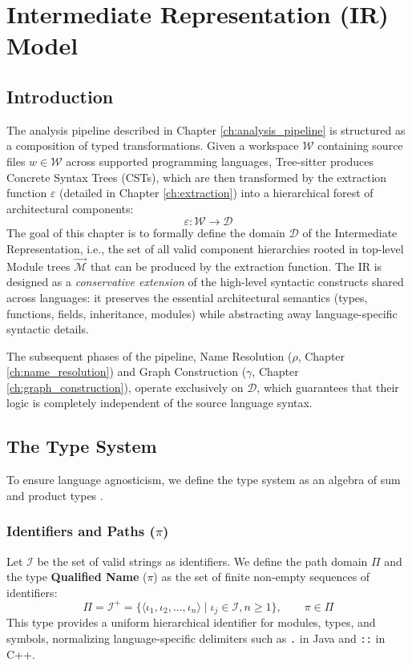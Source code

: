 \chapter{Intermediate Representation (IR) Model}
\label{ch:ir_formalization}

\section{Introduction}
The analysis pipeline described in Chapter \ref{ch:analysis_pipeline}
is structured as a composition of typed transformations. Given a
workspace $\mathcal{W}$ containing source files $w \in \mathcal{W}$
across supported programming languages, Tree-sitter produces Concrete
Syntax Trees (CSTs), which are then transformed by the extraction
function $\varepsilon$ (detailed in Chapter \ref{ch:extraction}) into
a hierarchical forest of architectural components: $$\varepsilon :
\mathcal{W} \to
\mathcal{D}$$ The goal of this chapter is to formally define the
domain $\mathcal{D}$ of the Intermediate Representation, i.e., the
set of all valid component hierarchies rooted in top-level Module
trees $\vec{\mathcal{M}}$ that can be produced by the extraction
function. The IR is designed as a
\textit{conservative extension} \cite{aho_compilers_2007}
of the high-level syntactic constructs shared across languages: it
preserves the essential architectural semantics (types, functions,
fields, inheritance, modules) while abstracting away
language-specific syntactic details.

The subsequent phases of the pipeline, Name Resolution ($\rho$,
Chapter \ref{ch:name_resolution}) and Graph Construction ($\gamma$,
Chapter \ref{ch:graph_construction}), operate exclusively on
$\mathcal{D}$, which guarantees that their logic is completely
independent of the source language syntax.

\section{The Type System}
To ensure language agnosticism, we define the type system as an
algebra of sum and product types \cite{pierce_types_2002}.

\subsection{Identifiers and Paths ($\pi$)}
Let $\mathcal{I}$ be the set of valid strings as identifiers. We
define the path domain $\Pi$ and the type \textbf{Qualified Name} ($\pi$)
as the set of finite non-empty sequences of identifiers:
$$\Pi = \mathcal{I}^+ = \{ \langle \iota_1, \iota_2, \dots, \iota_n \rangle \mid
\iota_j \in \mathcal{I}, n \geq 1 \}, \qquad \pi \in \Pi$$
This type provides a uniform hierarchical identifier for modules, types,
and symbols, normalizing language-specific delimiters such as \texttt{.} in Java
and \texttt{::} in C++.

